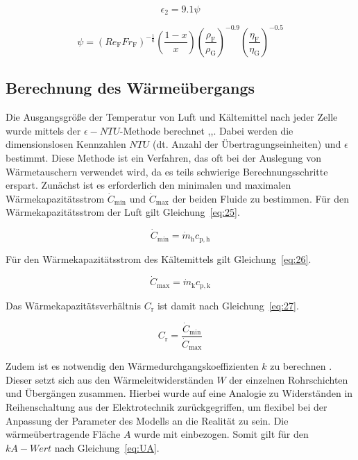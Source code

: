 \begin{equation}
\label{eq:23}
\epsilon_2 = 9.1 \psi
\end{equation}

\begin{equation}
\label{eq:24}
\psi = (Re_\mathrm{F} Fr_\mathrm{F})^{-\frac{1}{6}} \left( \frac{1-x}{x} \right) \left(\frac{\rho_\mathrm{F}}{\rho_\mathrm{G}} \right)^{-0.9} \left(\frac{\eta_\mathrm{F}}{\eta_\mathrm{G}} \right)^{-0.5}
\end{equation}

\subsection{Berechnung des Wärmeübergangs}
\label{subsec:Berechnung des Wärmeübergangs}

Die Ausgangsgröße der Temperatur von Luft und Kältemittel nach jeder Zelle wurde mittels der $\epsilon-NTU$-Methode berechnet \cite{SpringerVerlagGmbH.2013},\cite{Bergman.2011},\cite{Nellis.2009}. Dabei werden die dimensionslosen Kennzahlen $NTU$ (dt. Anzahl der Übertragungseinheiten) und $\epsilon$ bestimmt. Diese Methode ist ein Verfahren, das oft bei der Auslegung von Wärmetauschern verwendet wird, da es teils schwierige Berechnungsschritte erspart. Zunächst ist es erforderlich den minimalen und maximalen Wärmekapazitätsstrom $\dot{C}_{\mathrm{min}}$ und $\dot{C}_{\mathrm{max}}$ der beiden Fluide zu bestimmen.
Für den Wärmekapazitätsstrom der Luft gilt Gleichung~\ref{eq:25}.

\begin{equation}
\label{eq:25}
\dot{C}_{\mathrm{min}} = \dot{m}_\mathrm{h} c_{\mathrm{p,h}}
\end{equation} 

Für den Wärmekapazitätsstrom des Kältemittels gilt Gleichung~\ref{eq:26}.

\begin{equation}
\label{eq:26}
\dot{C}_{\mathrm{max}} = \dot{m}_\mathrm{k} c_{\mathrm{p,k}}
\end{equation}
 

Das Wärmekapazitätsverhältnis $C_\mathrm{r}$ ist damit nach Gleichung~\ref{eq:27}.
 
\begin{equation}
\label{eq:27}
C_\mathrm{r} = \frac{\dot{C}_{\mathrm{min}}}{\dot{C}_{\mathrm{max}}}
\end{equation}

Zudem ist es notwendig den Wärmedurchgangskoeffizienten $k$ zu berechnen \cite{LehrstuhlfurWarmeundStoffubertragung.}. Dieser setzt sich aus den Wärmeleitwiderständen $W$ der einzelnen Rohrschichten und Übergängen zusammen.  Hierbei wurde auf eine Analogie zu Widerständen in Reihenschaltung aus der Elektrotechnik zurückgegriffen, um flexibel bei der Anpassung der Parameter des Modells an die Realität zu sein. Die wärmeübertragende Fläche $A$ wurde mit einbezogen. Somit gilt für den $kA-Wert$ nach Gleichung~\ref{eq:UA}.

